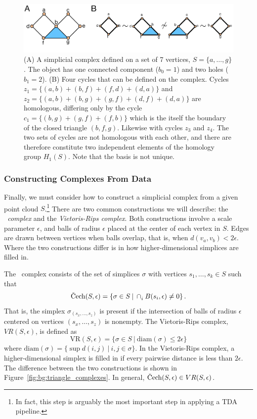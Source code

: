 \begin{figure}
\centering
\includegraphics[]{./fig/background/homology_example.pdf}
\caption[Simplicial Homology]{(A) A simplicial complex defined on a set of 7 vertices, $S=\{a,\ldots,g\}$. The object has one connected component ($b_0=1$) and two holes ($b_1=2$). (B) Four cycles that can be defined on the complex. Cycles $z_1=\{(a,b)+(b,f)+(f,d)+(d,a)\}$ and $z_2=\{(a,b)+(b,g)+(g,f)+(d,f)+(d,a)\}$ are homologous, differing only by the cycle $c_1=\{(b,g)+(g,f)+(f,b)\}$ which is the itself the boundary of the closed triangle $(b,f,g)$. Likewise with cycles $z_3$ and $z_4$. The two sets of cycles are not homologous with each other, and there are therefore constitute two independent elements of the homology group $H_1(S)$. Note that the basis is not unique.}
\label{fig:bg:homology_example}
\end{figure}

\subsubsection{Constructing Complexes From Data}
\label{bg:tda:math:complexes}

Finally, we must consider how to construct a simplicial complex from a given point cloud $S$.\footnote{In fact, this step is arguably the most important step in applying a TDA pipeline.}
There are two common constructions we will describe: the \emph{\Cech\ complex} and the \emph{Vietoris-Rips complex}.
Both constructions involve a scale parameter $\epsilon$, and balls of radius $\epsilon$ placed at the center of each vertex in $S$.
Edges are drawn between vertices when balls overlap, that is, when $d(v_{a},v_{b})<2\epsilon$.
Where the two constructions differ is in how higher-dimensional simplices are filled in.

The \Cech\ complex consists of the set of simplices $\sigma$ with vertices $s_{1},\ldots,s_{k}\in S$ such that
\begin{equation}
\text{\Cech}(S, \epsilon) = \left\{ \sigma\in S \:|\: \displaystyle\cap_{i}^{} B(s_{i},\epsilon)\neq0 \right\}.
\end{equation}
That is, the simplex $\sigma_{(s_{x},\ldots,s_{z})}$ is present if the intersection of balls of radius $\epsilon$ centered on vertices $(s_{x},\ldots,s_{z}	)$ is nonempty.
The Vietoris-Rips complex, $VR(S,\epsilon)$, is defined as
\begin{equation}
\mathrm{VR}(S, \epsilon) = \{ \sigma\in S\:|\:\mathrm{diam}(\sigma) \leq 2\epsilon \}
\end{equation}
where $\mathrm{diam}(\sigma)=\{ \sup d(i,j) \:|\: i,j\in\sigma \}$.
In the Vietoris-Rips complex, a higher-dimensional simplex is filled in if every pairwise distance is less than $2\epsilon$.
The difference between the two constructions is shown in Figure~\ref{fig:bg:triangle_complexes}.
In general, $\text{\Cech}(S,\epsilon)\in VR(S,\epsilon)$.

